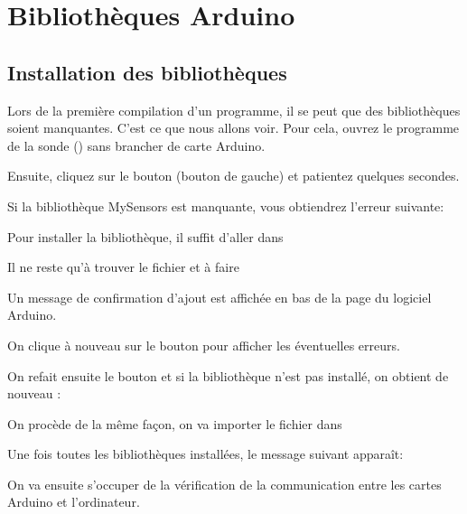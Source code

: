 \chapter{Bibliothèques Arduino}

\section{Installation des bibliothèques}

Lors de la première compilation d'un programme, il se peut que des bibliothèques soient manquantes.
C'est ce que nous allons voir. Pour cela, ouvrez le programme de la sonde () sans brancher de carte Arduino.

Ensuite, cliquez sur le bouton  (bouton de gauche) et patientez quelques secondes.\\


Si la bibliothèque MySensors est manquante, vous obtiendrez l'erreur suivante: 


Pour installer la bibliothèque, il suffit d'aller dans 


Il ne reste qu'à trouver le fichier  et à faire 


Un message de confirmation d'ajout est affichée en bas de la page du logiciel Arduino.


On clique à nouveau sur le bouton  pour afficher les éventuelles erreurs.

 

On refait ensuite le bouton  et si la bibliothèque  n'est pas installé, on obtient de nouveau : 


On procède de la même façon, on va importer le fichier  dans 

Une fois toutes les bibliothèques installées, le message suivant apparaît: 


On va ensuite s'occuper de la vérification de la communication entre les cartes Arduino et l'ordinateur.